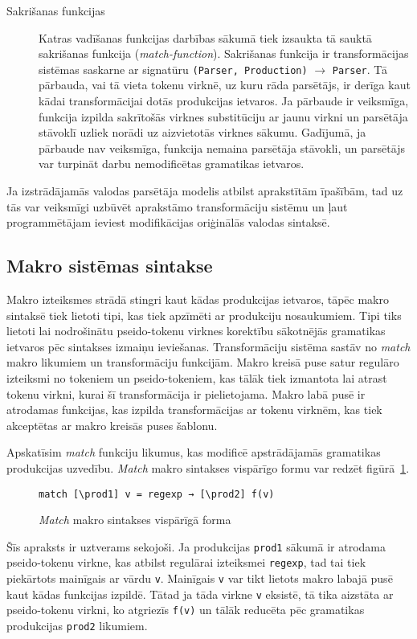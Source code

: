 \begin{description}
\item[Sakrišanas funkcijas]
Katras vadīšanas funkcijas darbības sākumā tiek izsaukta tā sauktā sakrišanas funkcija (\emph{match-function}). Sakrišanas funkcija ir transformācijas sistēmas saskarne ar signatūru \verb|(Parser, Production)| $\to$ \verb|Parser|. Tā pārbauda, vai tā vieta tokenu virknē, uz kuru rāda parsētājs, ir derīga kaut kādai transformācijai dotās produkcijas ietvaros. Ja pārbaude ir veiksmīga, funkcija izpilda sakrītošās virknes substitūciju ar jaunu virkni un parsētāja stāvoklī uzliek norādi uz aizvietotās virknes sākumu. Gadījumā,  ja pārbaude nav veiksmīga, funkcija nemaina parsētāja stāvokli, un parsētājs var turpināt darbu nemodificētas gramatikas ietvaros.
\end{description}

Ja izstrādājamās valodas parsētāja modelis atbilst aprakstītām īpašībām, tad uz tās var veiksmīgi uzbūvēt aprakstāmo transformāciju sistēmu un ļaut programmētājam ieviest modifikācijas oriģinālās valodas sintaksē.

\subsection{Makro sistēmas sintakse}
Makro izteiksmes strādā stingri kaut kādas produkcijas ietvaros, tāpēc makro sintaksē tiek lietoti tipi, kas tiek apzīmēti ar produkciju nosaukumiem. Tipi tiks lietoti lai nodrošinātu pseido-tokenu virknes korektību sākotnējās gramatikas ietvaros pēc sintakses izmaiņu ieviešanas. Transformāciju sistēma sastāv no \emph{match} makro likumiem un transformāciju funkcijām. Makro kreisā puse satur regulāro izteiksmi no tokeniem un pseido-tokeniem, kas tālāk tiek izmantota lai atrast tokenu virkni, kurai šī transformācija ir pielietojama. Makro labā pusē ir atrodamas funkcijas, kas izpilda transformācijas ar tokenu virknēm, kas tiek akceptētas ar makro kreisās puses šablonu.

Apskatīsim \textit{match} funkciju likumus, kas modificē apstrādājamās gramatikas produkcijas uzvedību. \emph{Match} makro sintakses vispārīgo formu var redzēt figūrā~\ref{fig:matchsyntax}.
\begin{figure}[h!]
\begin{verbatim}
match [\prod1] v = regexp → [\prod2] f(v)
\end{verbatim}
\caption{\label{fig:matchsyntax}\emph{Match} makro sintakses vispārīgā forma}
\end{figure}

Šīs apraksts ir uztverams sekojoši. Ja produkcijas \verb|prod1| sākumā ir atrodama pseido-tokenu virkne, kas atbilst regulārai izteiksmei \verb|regexp|, tad tai tiek piekārtots mainīgais ar vārdu \verb|v|. Mainīgais \verb|v| var tikt lietots makro labajā pusē kaut kādas funkcijas izpildē. Tātad ja tāda virkne \verb|v| eksistē, tā tika aizstāta ar pseido-tokenu virkni, ko atgriezīs \verb|f(v)|  un tālāk reducēta pēc gramatikas produkcijas \verb|prod2| likumiem. 

